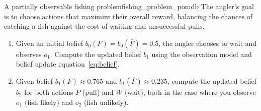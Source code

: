 \begin{nexercise}{A partially observable fishing problem}{fishing_problem_pomdb}
  The angler's goal is to choose actions that maximize their overall reward, balancing the chances of catching a fish against the cost of waiting and unsuccessful pulls.

  \begin{enumerate}
    \item Given an initial belief $b_0(F) = b_0(\overline{F}) = 0.5$, the angler chooses to wait and observes $o_1$.
    Compute the updated belief $b_1$ using the observation model and belief update equation~\eqref{eq:belief}.

    \item Given belief $b_1(F) \approx 0.765$ and $b_1(\overline{F}) \approx 0.235$, compute the updated belief $b_2$ for both actions $P$ (pull) and $W$ (wait), both in the case where you observe $o_1$ (fish likely) and $o_2$ (fish unlikely).
  \end{enumerate}
\end{nexercise}
